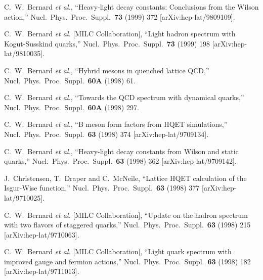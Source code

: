 \begin{thebibliography}{130}
C.~W.~Bernard {\it et al.},
``Heavy-light decay constants: Conclusions from the Wilson action,''
Nucl.\ Phys.\ Proc.\ Suppl.\  {\bf 73} (1999) 372
[arXiv:hep-lat/9809109].

C.~W.~Bernard {\it et al.}  [MILC Collaboration],
``Light hadron spectrum with Kogut-Susskind quarks,''
Nucl.\ Phys.\ Proc.\ Suppl.\  {\bf 73} (1999) 198
[arXiv:hep-lat/9810035].



C.~W.~Bernard {\it et al.},
``Hybrid mesons in quenched lattice QCD,''
Nucl.\ Phys.\ Proc.\ Suppl.\  {\bf 60A} (1998) 61.

C.~W.~Bernard {\it et al.},
``Towards the QCD spectrum with dynamical quarks,''
Nucl.\ Phys.\ Proc.\ Suppl.\  {\bf 60A} (1998) 297.


C.~W.~Bernard {\it et al.},
``B meson form factors from HQET simulations,''
Nucl.\ Phys.\ Proc.\ Suppl.\  {\bf 63} (1998) 374
[arXiv:hep-lat/9709134].

C.~W.~Bernard {\it et al.},
``Heavy-light decay constants from Wilson and static quarks,''
Nucl.\ Phys.\ Proc.\ Suppl.\  {\bf 63} (1998) 362
[arXiv:hep-lat/9709142].

J.~Christensen, T.~Draper and C.~McNeile,
``Lattice HQET calculation of the Isgur-Wise function,''
Nucl.\ Phys.\ Proc.\ Suppl.\  {\bf 63} (1998) 377
[arXiv:hep-lat/9710025].

C.~W.~Bernard {\it et al.}  [MILC Collaboration],
``Update on the hadron spectrum with two flavors of staggered quarks,''
Nucl.\ Phys.\ Proc.\ Suppl.\  {\bf 63} (1998) 215
[arXiv:hep-lat/9710063].

C.~W.~Bernard {\it et al.}  [MILC Collaboration],
``Light quark spectrum with improved gauge and fermion actions,''
Nucl.\ Phys.\ Proc.\ Suppl.\  {\bf 63} (1998) 182
[arXiv:hep-lat/9711013].


\end{thebibliography}
